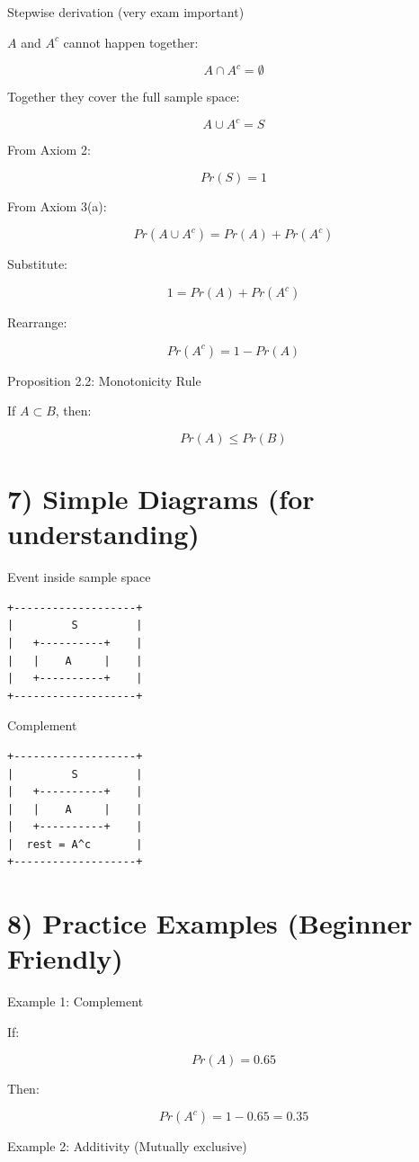 \documentclass[12pt,a4paper]{article}
\begin{document}
Stepwise derivation (very exam important)

$A$ and $A^c$ cannot happen together:

\[
A \cap A^c = \emptyset
\]

Together they cover the full sample space:

\[
A \cup A^c = S
\]

From Axiom 2:

\[
Pr(S) = 1
\]

From Axiom 3(a):

\[
Pr(A \cup A^c) = Pr(A) + Pr(A^c)
\]

Substitute:

\[
1 = Pr(A) + Pr(A^c)
\]

Rearrange:

\[
Pr(A^c) = 1 - Pr(A)
\]

Proposition 2.2: Monotonicity Rule

If $A \subset B$, then:

\[
Pr(A) \le Pr(B)
\]

\section*{7) Simple Diagrams (for understanding)}

Event inside sample space

\begin{verbatim}
+-------------------+
|         S         |
|   +----------+    |
|   |    A     |    |
|   +----------+    |
+-------------------+
\end{verbatim}

Complement

\begin{verbatim}
+-------------------+
|         S         |
|   +----------+    |
|   |    A     |    |
|   +----------+    |
|  rest = A^c       |
+-------------------+
\end{verbatim}

\section*{8) Practice Examples (Beginner Friendly)}

Example 1: Complement

If:

\[
Pr(A) = 0.65
\]

Then:

\[
Pr(A^c) = 1 - 0.65 = 0.35
\]

Example 2: Additivity (Mutually exclusive)
\end{document}
